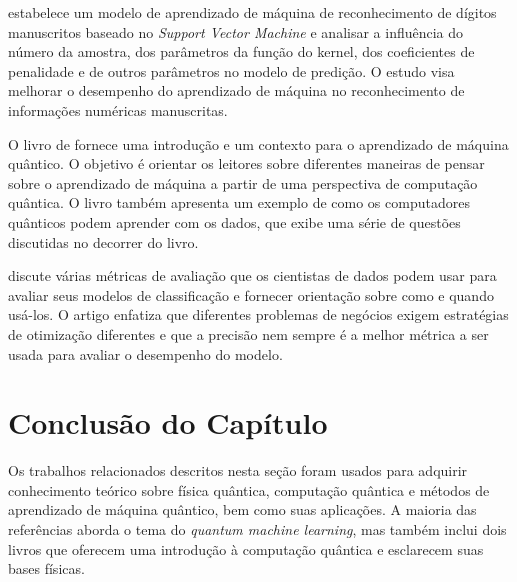  estabelece um modelo de aprendizado de máquina de reconhecimento de dígitos manuscritos baseado no \textit{Support Vector Machine} e analisar a influência do número da amostra, dos parâmetros da função do kernel, dos coeficientes de penalidade e de outros parâmetros no modelo de predição. O estudo visa melhorar o desempenho do aprendizado de máquina no reconhecimento de informações numéricas manuscritas.

O livro de  fornece uma introdução e um contexto para o aprendizado de máquina quântico. O objetivo é orientar os leitores sobre diferentes maneiras de pensar sobre o aprendizado de máquina a partir de uma perspectiva de computação quântica. O livro também apresenta um exemplo de como os computadores quânticos podem aprender com os dados, que exibe uma série de questões discutidas no decorrer do livro.

 discute várias métricas de avaliação que os cientistas de dados podem usar para avaliar seus modelos de classificação e fornecer orientação sobre como e quando usá-los. O artigo enfatiza que diferentes problemas de negócios exigem estratégias de otimização diferentes e que a precisão nem sempre é a melhor métrica a ser usada para avaliar o desempenho do modelo.

\section{Conclusão do Capítulo}

Os trabalhos relacionados descritos nesta seção foram usados para adquirir conhecimento teórico sobre física quântica, computação quântica e métodos de aprendizado de máquina quântico, bem como suas aplicações. A maioria das referências aborda o tema do \textit{quantum machine learning}, mas também inclui dois livros que oferecem uma introdução à computação quântica e esclarecem suas bases físicas.